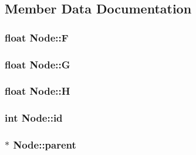 \subsection{Member Data Documentation}
\subsubsection[{\texorpdfstring{F}{F}}]{\setlength{\rightskip}{0pt plus 5cm}float Node\+::F\hspace{0.3cm}{\ttfamily [private]}}\hypertarget{classNode_aa68bc86c2839aca9c05e43541dc973a5}{}\label{classNode_aa68bc86c2839aca9c05e43541dc973a5}
\subsubsection[{\texorpdfstring{G}{G}}]{\setlength{\rightskip}{0pt plus 5cm}float Node\+::G\hspace{0.3cm}{\ttfamily [private]}}\hypertarget{classNode_a3c6a67023068f762eaaa8a4861ab3e9f}{}\label{classNode_a3c6a67023068f762eaaa8a4861ab3e9f}
\subsubsection[{\texorpdfstring{H}{H}}]{\setlength{\rightskip}{0pt plus 5cm}float Node\+::H\hspace{0.3cm}{\ttfamily [private]}}\hypertarget{classNode_a26426055f336a81dc05680b981e4c270}{}\label{classNode_a26426055f336a81dc05680b981e4c270}
\subsubsection[{\texorpdfstring{id}{id}}]{\setlength{\rightskip}{0pt plus 5cm}int Node\+::id}\hypertarget{classNode_a59a543130a10c95f1e8642cf8c5645e8}{}\label{classNode_a59a543130a10c95f1e8642cf8c5645e8}
\subsubsection[{\texorpdfstring{parent}{parent}}]{$\ast$ Node\+::parent}\hypertarget{classNode_ad8184598cdea70e4bbdfd76f2b0f9e85}{}\label{classNode_ad8184598cdea70e4bbdfd76f2b0f9e85}
